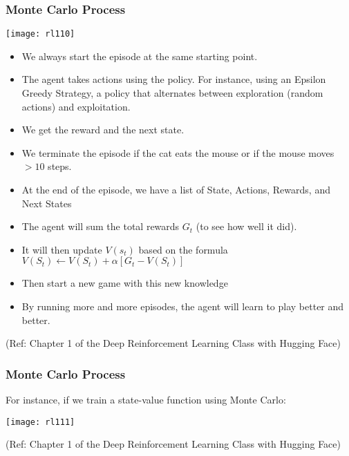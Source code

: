 \begin{frame}[fragile]\frametitle{Monte Carlo Process}


\begin{center}
\texttt{[image: rl110]}
\end{center}


\begin{itemize}
\item We always start the episode at the same starting point.
\item The agent takes actions using the policy. For instance, using an Epsilon Greedy Strategy, a policy that alternates between exploration (random actions) and exploitation.
\item We get the reward and the next state.
\item We terminate the episode if the cat eats the mouse or if the mouse moves $> 10$ steps.
\item At the end of the episode, we have a list of State, Actions, Rewards, and Next States
\item  The agent will sum the total rewards $G_t$ (to see how well it did).
\item It will then update $V(s_t)$ based on the formula $V(S_t) \leftarrow V(S_t) + \alpha [ G_t - V(S_t)]$
\item Then start a new game with this new knowledge
\item By running more and more episodes, the agent will learn to play better and better.
\end{itemize}


{\tiny (Ref: Chapter 1 of the Deep Reinforcement Learning Class with Hugging Face)}

\end{frame}


\begin{frame}[fragile]\frametitle{Monte Carlo Process}

For instance, if we train a state-value function using Monte Carlo:

\begin{center}
\texttt{[image: rl111]}
\end{center}



{\tiny (Ref: Chapter 1 of the Deep Reinforcement Learning Class with Hugging Face)}

\end{frame}


